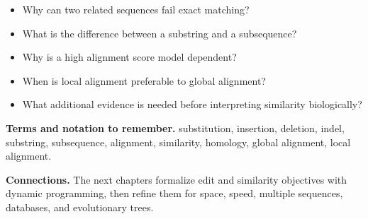\documentclass[11pt]{article}
\begin{document}
\begin{tcolorbox}[enhanced,breakable,title={Self-test questions},
  colback=white,colframe=Accent,fonttitle=\small\sffamily\bfseries,fontupper=\footnotesize,
  boxsep=0.6mm,left=1.5mm,right=1.5mm,top=1mm,bottom=1mm,before skip=3pt,after skip=3pt]
\begin{itemize}
  \item Why can two related sequences fail exact matching?
  \item What is the difference between a substring and a subsequence?
  \item Why is a high alignment score model dependent?
  \item When is local alignment preferable to global alignment?
  \item What additional evidence is needed before interpreting similarity biologically?
\end{itemize}
\end{tcolorbox}

{\footnotesize
\textbf{Terms and notation to remember.} substitution, insertion, deletion, indel, substring, subsequence, alignment, similarity, homology, global alignment, local alignment.

\textbf{Connections.} The next chapters formalize edit and similarity objectives with dynamic programming, then refine them for space, speed, multiple sequences, databases, and evolutionary trees.
}
\end{document}
